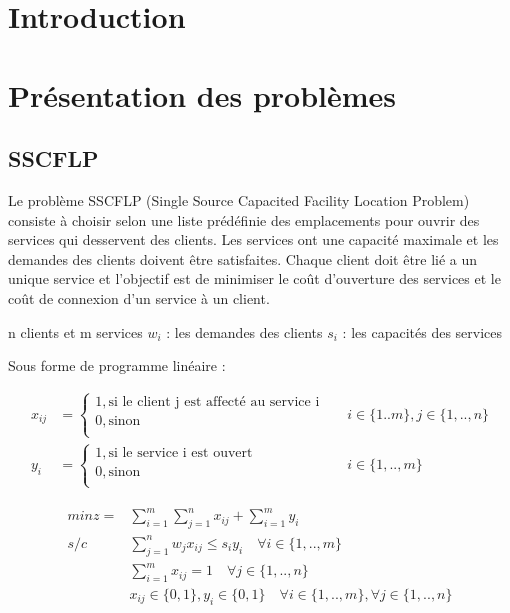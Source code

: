 \section{Introduction}

\section{Présentation des problèmes}

\subsection{SSCFLP}

Le problème SSCFLP (Single Source Capacited Facility Location Problem) consiste à choisir selon une liste prédéfinie des emplacements pour ouvrir des services qui desservent des clients. Les services ont une capacité maximale et les demandes des clients doivent être satisfaites. Chaque client doit être lié a un unique service et l'objectif est de minimiser le  coût d'ouverture des services et le coût de connexion d'un service à un client. \newline

n clients et m services
$w_i$ : les demandes des clients
$s_i$ : les capacités des services

Sous forme de programme linéaire :


\begin{align*}
x_{ij} &= \begin{cases}
        1, \text{si le client j est affecté au service i}\\
        0, \text{sinon} \\
    \end{cases}
&&i \in \{1..m\}, j \in \{1,..,n\} \\
y_i &= \begin{cases}
        1, \text{si le service i est ouvert}\\
        0, \text{sinon} \\
    \end{cases}
&&i \in \{1,..,m\}
\end{align*}



\begin{align}
min z = &\sum\limits_{i=1}^m \sum\limits_{j=1}^n x_{ij} + \sum\limits_{i=1}^m y_i \\
  s/c \quad &\sum\limits_{j=1}^n w_j x_{ij} \leq s_i y_i \quad \forall i \in \{1, .., m\} \\
            &\sum\limits_{i=1}^m x_{ij} = 1 \quad \forall j \in \{1, .., n\} \\
            &x_{ij} \in \{0,1\}, y_i \in \{0,1\} \quad \forall i \in \{1,..,m\}, \forall j \in \{1,..,n\}
\end{align}

